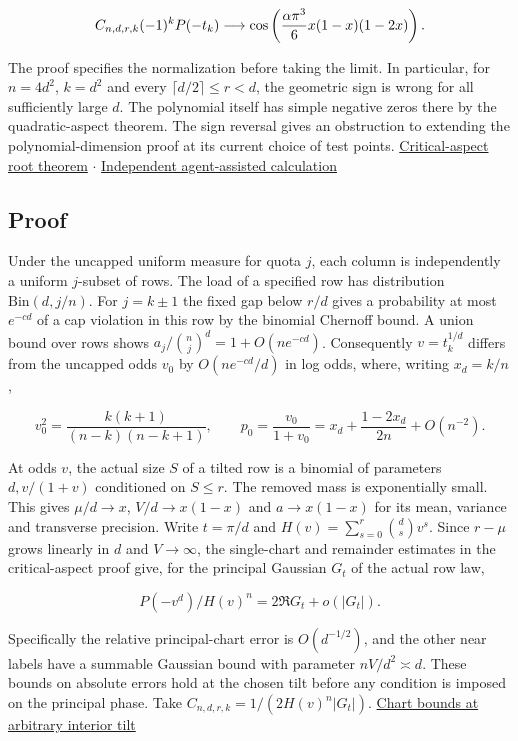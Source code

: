 \documentclass[11pt]{article}
\begin{document}
\[
C_{n,d,r,k}(-1)^kP(-t_k)\longrightarrow
\cos\negthinspace{}\left(\frac{\alpha\pi^3}{6}x(1-x)(1-2x)\right).
\]

The proof specifies the normalization before taking the limit. In particular, for $n=4d^2$, $k=d^2$ and every $\lceil d/2\rceil\le r<d$, the geometric sign is wrong for all sufficiently large $d$. The polynomial itself has simple negative zeros there by the quadratic-aspect theorem. The sign reversal gives an obstruction to extending the polynomial-dimension proof at its current choice of test points. \href{https://github.com/ProgramComputer/open-math-research/blob/main/topics/balanced-arrays/critical-aspect/README.md}{Critical-aspect root theorem}  $\cdot$  \href{https://github.com/ProgramComputer/open-math-research/blob/main/topics/balanced-arrays/effective-sublinear/square-phase-review.md}{Independent agent-assisted calculation}

\subsection{Proof}

Under the uncapped uniform measure for quota $j$, each column is independently a uniform $j$-subset of rows. The load of a specified row has distribution $\mathrm{Bin}(d,j/n)$. For $j=k\pm1$ the fixed gap below $r/d$ gives a probability at most $e^{-cd}$ of a cap violation in this row by the binomial Chernoff bound. A union bound over rows shows $a_j/\binom nj^d=1+O(ne^{-cd})$. Consequently $v=t_k^{1/d}$ differs from the uncapped odds $v_0$ by $O(ne^{-cd}/d)$ in log odds, where, writing $x_d=k/n$,

\[
v_0^2=\frac{k(k+1)}{(n-k)(n-k+1)},\qquad
p_0=\frac{v_0}{1+v_0}=x_d+\frac{1-2x_d}{2n}+O(n^{-2}).
\]

At odds $v$, the actual size $S$ of a tilted row is a binomial of parameters $d,v/(1+v)$ conditioned on $S\le r$. The removed mass is exponentially small. This gives $\mu/d\to x$, $V/d\to x(1-x)$ and $a\to x(1-x)$ for its mean, variance and transverse precision. Write $t=\pi/d$ and $H(v)=\sum_{s=0}^r\binom ds v^s$. Since $r-\mu$ grows linearly in $d$ and $V\to\infty$, the single-chart and remainder estimates in the critical-aspect proof give, for the principal Gaussian $G_t$ of the actual row law,

\[
P(-v^d)/H(v)^n=2\Re G_t+o(|G_t|).
\]

Specifically the relative principal-chart error is $O(d^{-1/2})$, and the other near labels have a summable Gaussian bound with parameter $nV/d^2\asymp d$. These bounds on absolute errors hold at the chosen tilt before any condition is imposed on the principal phase. Take $C_{n,d,r,k}=1/(2H(v)^n|G_t|)$. \href{https://github.com/ProgramComputer/open-math-research/blob/main/topics/balanced-arrays/critical-aspect/critical-aspect-angular-nodes.md}{Chart bounds at arbitrary interior tilt}
\end{document}
